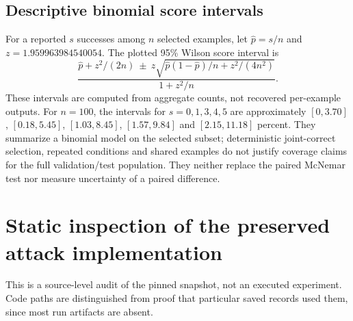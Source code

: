\subsection{Descriptive binomial score intervals}
For a reported $s$ successes among $n$ selected examples, let $\widehat p=s/n$ and $z=1.959963984540054$. The plotted 95\% Wilson score interval \cite{wilson1927} is
\begin{equation}
\frac{\widehat p+z^2/(2n)\ \pm\ z\sqrt{\widehat p(1-\widehat p)/n+z^2/(4n^2)}}{1+z^2/n}.
\end{equation}
These intervals are computed from aggregate counts, not recovered per-example outputs. For $n=100$, the intervals for $s=0,1,3,4,5$ are approximately $[0,3.70]$, $[0.18,5.45]$, $[1.03,8.45]$, $[1.57,9.84]$ and $[2.15,11.18]$ percent. They summarize a binomial model on the selected subset; deterministic joint-correct selection, repeated conditions and shared examples do not justify coverage claims for the full validation/test population. They neither replace the paired McNemar test nor measure uncertainty of a paired difference.

\section{Static inspection of the preserved attack implementation}
\label{sec:static_audit}
This is a source-level audit of the pinned snapshot, not an executed experiment. Code paths are distinguished from proof that particular saved records used them, since most run artifacts are absent.

